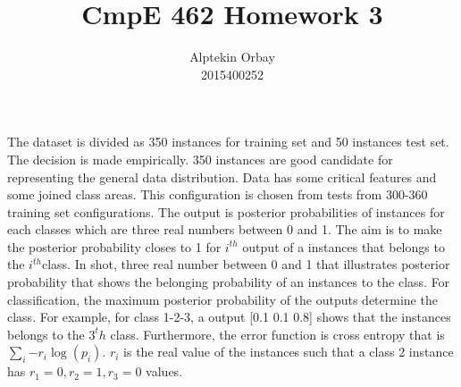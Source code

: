 \documentclass[12pt]{article}
\title{CmpE 462 Homework 3}
\author{Alptekin Orbay \\ 2015400252}
\begin{document}
\maketitle

	The dataset is divided as 350 instances for training set and 50 instances test set. The decision is made empirically. 350 instances are good candidate for representing the general data distribution. Data has some critical features and some joined class areas. This configuration is chosen from tests from  300-360 training set configurations.
	The output is posterior probabilities of instances for each classes which are three real numbers between 0 and 1. The aim is to make the posterior probability closes to 1 for $i^{th}$ output of a instances that belongs to the  $i^{th}$class. In shot, three real number between 0 and 1 that illustrates posterior probability that shows the belonging probability of an instances to the class. For classification, the maximum posterior probability of the outputs determine the class. For example, for class 1-2-3, a output [0.1 0.1 0.8] shows that the instances belongs to the $3^th$ class. Furthermore, the error function is cross entropy that is $\sum_i{- r_i\log (p_i)}$.
$r_i$ is the real value of the instances such that a class 2 instance has $ r_1 = 0 , r_2 = 1, r_3 = 0$  
values.
\end{document}
